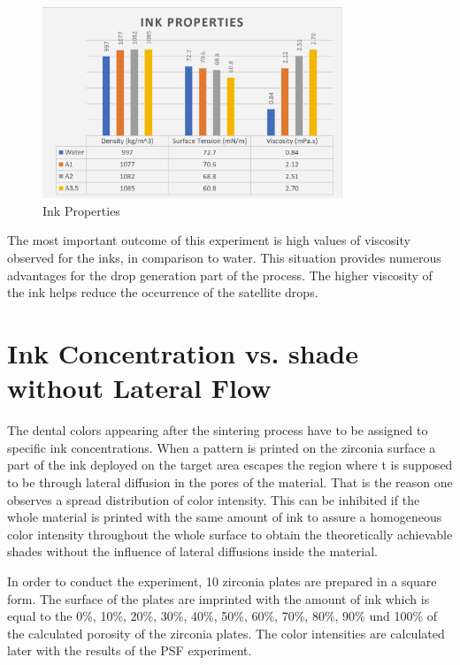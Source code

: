 \begin{figure}[H]
	\centering
	\includegraphics[width=0.8\textwidth]{grafiken/InkProps.jpg}
	\caption{Ink Properties}
	\label{fig:InkProps}
\end{figure} 

\bigskip

The most important outcome of this experiment is high values of viscosity observed for the inks, in comparison to water. This situation provides numerous advantages for the drop generation part of the process. The higher viscosity of the ink helps reduce the occurrence of the satellite drops.

\section{Ink Concentration vs. shade without Lateral Flow}

The dental colors appearing after the sintering process have to be assigned to specific ink concentrations. When a pattern is printed on the zirconia surface a part of the ink deployed on the target area escapes the region where t is supposed to be through lateral diffusion in the pores of the material. That is the reason one observes a spread distribution of color intensity. This can be inhibited if the whole material is printed with the same amount of ink to assure a homogeneous color intensity throughout the whole surface to obtain the theoretically achievable shades without the influence of lateral diffusions inside the material.

In order to conduct the experiment, 10 zirconia plates are prepared in a square form. The surface of the plates are imprinted with the amount of ink which is equal to the 0\%, 10\%, 20\%, 30\%, 40\%, 50\%, 60\%, 70\%, 80\%, 90\% und 100\% of the calculated porosity of the zirconia plates. The color intensities are calculated later with the results of the PSF experiment.




